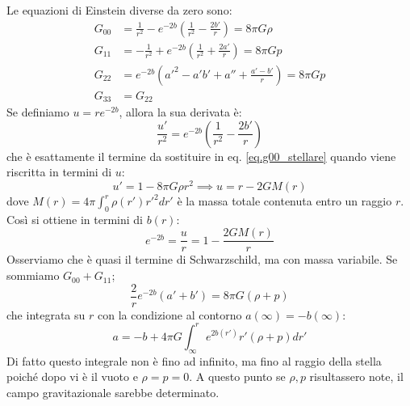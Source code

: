 Le equazioni di Einstein diverse da zero sono:
\begin{align}
    G_{00} &= \frac{1}{r^2} - e^{-2b}\left(\frac{1}{r^2} - \frac{2b'}{r}\right) = 8\pi G \rho \label{eq.g00_stellare} \\
    G_{11} &= -\frac{1}{r^2}+e^{-2b}\left(\frac{1}{r^2} + \frac{2a'}{r}\right) = 8\pi G p \label{eq.g_11_stellare}\\
    G_{22} &= e^{-2b}\left(a'^2 -a'b' + a'' +\frac{a' - b'}{r}\right) = 8\pi G p \label{eq.g22_stellare}\\
    G_{33} &= G_{22}
\end{align}
Se definiamo $u = re^{-2b}$, allora la sua derivata è:
\begin{equation}
    \frac{u'}{r^2} = e^{-2b}\left( \frac{1}{r^2} - \frac{2b'}{r}\right)
    \label{eq.u_stellare}
\end{equation}
che è esattamente il termine da sostituire in eq. \ref{eq.g00_stellare} quando viene riscritta in termini di $u$:
\begin{equation*}
    u' = 1 - 8\pi G \rho r^2 \implies u = r- 2GM(r)
\end{equation*}
dove $M(r) = 4\pi \int_0^r \rho(r')r'^2dr'$ è la massa totale contenuta entro un raggio $r$.
Così si ottiene in termini di $b(r)$:
\begin{equation}
    e^{-2b} = \frac{u}{r} = 1 - \frac{2GM(r)}{r}
    \label{eq.expb_stellare}
\end{equation}
Osserviamo che è quasi il termine di Schwarzschild, ma con massa variabile.
Se sommiamo $G_{00} + G_{11}$;
\begin{equation*}
    \frac{2}{r}e^{-2b}(a'+b') = 8\pi G (\rho + p)
\end{equation*}
che integrata su $r$ con la condizione al contorno $a(\infty) = - b(\infty)$:
\begin{equation}
    a = - b + 4\pi G\int_{\infty}^r e^{2b(r')}r'(\rho + p) dr'
    \label{eq.a_stellare}
\end{equation}
Di fatto questo integrale non è fino ad infinito, ma fino al raggio della stella poiché dopo vi è il vuoto e $\rho = p = 0$. A questo punto se $\rho, p$ risultassero note, il campo gravitazionale sarebbe determinato.

